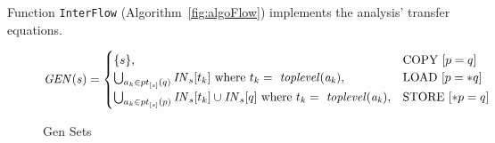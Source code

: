 \begin{algorithm*}
\OutData{}
\end{algorithm*}
\DecMargin{1em}
Function \texttt{InterFlow} (Algorithm~\ref{fig:algoFlow})
implements the analysis' transfer equations.

\begin{figure*}
\[
	\mathit{GEN}(s)	=
	\begin{cases}
		\set{s},	&\text{COPY\ [$p = q$]}	\\
		\bigcup_{a_k \in \pointsto{s}{q}}^{} \myinflow{}_s[t_k]\ \text{where}\ t_k =\ \mathit{toplevel(a_k)},	&\text{LOAD\ [$p = *q$]}	\\		
		\bigcup_{a_k \in \pointsto{s}{p}}^{} \myinflow{}_s[t_k] \cup \myinflow{}_s[q]\ \text{where}\ t_k =\ \mathit{toplevel(a_k)},	&\text{STORE\ [$*p = q$]}				
	\end{cases}
\]
\caption{Gen Sets}
\end{figure*}

